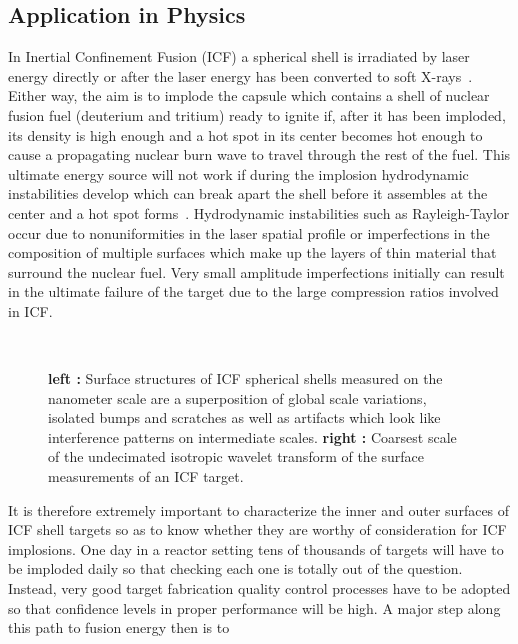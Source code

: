 \subsection{Application in Physics}
\label{section:bedros}
In Inertial Confinement Fusion (ICF) a spherical shell is irradiated by laser energy directly or after the 
laser energy has been converted to soft X-rays~\cite{bedros:atzeni}. Either way, the aim is to implode the 
capsule which contains a shell of nuclear fusion fuel (deuterium and tritium) ready to ignite if, after it 
has been imploded, its density is high enough and a hot spot in its center becomes hot enough to cause a 
propagating nuclear burn wave to travel through the rest of the fuel. This ultimate energy source will not 
work if during the implosion hydrodynamic instabilities develop which can break apart the shell before it 
assembles at the center and a hot spot forms~\cite{bedros:lindl}. Hydrodynamic instabilities such as Rayleigh-Taylor 
occur due to nonuniformities in the laser spatial profile or imperfections in the composition of multiple 
surfaces which make up the layers of thin material that surround the nuclear  fuel. Very small amplitude imperfections 
initially can result in the ultimate failure of the target due to the large compression ratios involved in ICF.
\begin{figure}
\centerline{
\hbox{
}
}
\caption{ \textbf{left : }Surface structures of ICF spherical shells measured on the nanometer scale are a superposition of global scale variations, isolated bumps and scratches as well as artifacts which look like interference patterns on intermediate scales. \textbf{right :} Coarsest scale of the undecimated isotropic wavelet transform of the surface measurements of an ICF target.}
\label{bedros_mca_data}
\end{figure}
It is therefore extremely important to characterize the inner and outer surfaces of ICF shell targets 
so as to know whether they are worthy of consideration for ICF implosions. One day in a reactor setting 
tens of thousands of targets will have to be imploded daily so that checking each one is totally 
out of the question. Instead, very good target fabrication quality control processes have to be adopted so that 
confidence levels in proper performance will be high. A major step along this path to fusion energy then is to 

